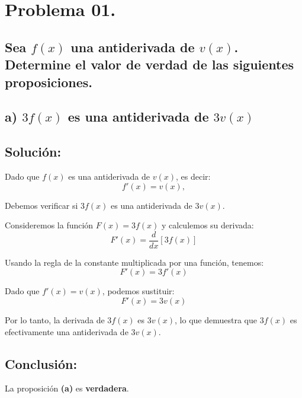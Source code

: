 \documentclass{article}
\begin{document}
\large %

\section*{Problema 01.}

\subsection*{Sea \(f(x)\) una antiderivada de \(v(x)\). Determine el valor de verdad de las siguientes proposiciones.}

\subsection*{\newline a) \(3f(x)\) es una antiderivada de \(3v(x)\)}
\subsection*{Solución: } 

Dado que \(f(x)\) es una antiderivada de \(v(x)\), es decir:
\[
f'(x) = v(x),
\]

\noindent Debemos verificar si \(3f(x)\) es una antiderivada de \(3v(x)\).

\noindent \newline Consideremos la función \(F(x) = 3f(x)\) y calculemos su derivada:
\[
F'(x) = \frac{d}{dx}[3f(x)]
\]

\noindent \newline Usando la regla de la constante multiplicada por una función, tenemos:
\[
F'(x) = 3f'(x)
\]

\noindent Dado que \(f'(x) = v(x)\), podemos sustituir:
\[
F'(x) = 3v(x)
\]

\noindent Por lo tanto, la derivada de \(3f(x)\) es \(3v(x)\), lo que demuestra que \(3f(x)\) es efectivamente una antiderivada de \(3v(x)\).

\subsection*{Conclusión:}

La proposición \textbf{(a)} es \textbf{verdadera}.
\end{document}
